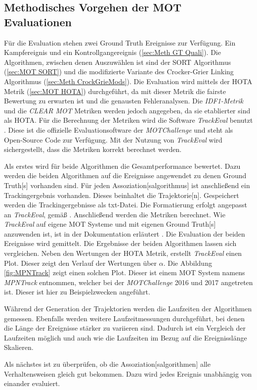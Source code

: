 \subsection{Methodisches Vorgehen der MOT Evaluationen}
Für die Evaluation stehen zwei \gls{Ground Truth} Ereignisse zur Verfügung. Ein Kampfereignis und ein Kontrollgangereignis (\ref{sec:Meth GT Quali}). Die Algorithmen, zwischen denen Auszuwählen ist sind der \acrshort{SORT} Algorithmus (\ref{sec:MOT SORT}) und die modifizierte Variante des Crocker-Grier Linking Algorithmus (\ref{sec:Meth CrockGrieMods}). Die Evaluation wird mittels der \gls{HOTA} Metrik (\ref{sec:MOT HOTA}) durchgeführt, da mit dieser Metrik die fairste Bewertung zu erwarten ist und die genausten Fehleranalysen. Die \textit{\gls{IDF1}-Metrik} und die \textit{\acrshort{CLEAR} \gls{MOT}} Metriken werden jedoch angegeben, da sie etablierter sind als \gls{HOTA}. Für die Berechnung der Metriken wird die Software \textit{TrackEval} benutzt \cite{TrackEval.2020}. Diese ist die offizielle Evaluationsoftware der \textit{MOTChallenge} und steht als Open-Source Code zur Verfügung. Mit der Nutzung von \textit{TrackEval} wird sichergestellt, dass die Metriken korrekt berechnet werden. \par

Als erstes wird für beide Algorithmen die Gesamtperformance bewertet. Dazu werden die beiden Algorithmen auf die Ereignisse angewendet zu denen \gls{Ground Truth}[s] vorhanden sind. Für jeden \gls{Assoziation}[salgorithmus] ist anschließend ein Trackingergebnis vorhanden. Dieses beinhaltet die \gls{Trajektorie}[n]. Gespeichert werden die Trackingergebnisse als txt-Datei. Die Formatierung erfolgt angepasst an \textit{TrackEval}, gemäß \cite{MOT15}. Anschließend werden die Metriken berechnet. Wie \textit{TrackEval} auf eigene \gls{MOT} Systeme und mit eigenen \gls{Ground Truth}[s] anzuwenden ist, ist in der Dokumentation erläutert \cite{TrackEval.2020}. Die Evaluation der beiden Ereignisse wird gemittelt. Die Ergebnisse der beiden Algorithmen lassen sich vergleichen. Neben den Wertungen der \gls{HOTA} Metrik, erstellt \textit{TrackEval} einen Plot. Dieser zeigt den Verlauf der Wertungen über \(\alpha\). Die Abbildung \ref{fig:MPNTrack} zeigt einen solchen Plot. Dieser ist einem \gls{MOT} System namens \textit{MPNTrack} entnommen, welcher bei der \textit{MOTChallenge} 2016 und 2017 angetreten ist. Dieser ist hier zu Beispielzwecken angeführt. 


Während der Generation der Trajektorien werden die Laufzeiten der Algorithmen gemessen. Ebenfalls werden weitere Laufzeitmessungen durchgeführt, bei denen die Länge der Ereignisse stärker zu variieren sind. Dadurch ist ein Vergleich der Laufzeiten möglich und auch wie die Laufzeiten im Bezug auf die Ereignisslänge Skalieren.\par 

Als nächstes ist zu überprüfen, ob die \gls{Assoziation}[salgorithmen] alle Verhaltensweisen 
gleich gut  bekommen. Dazu wird jedes Ereignis unabhängig von einander evaluiert.\par
